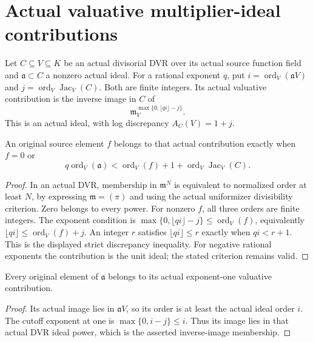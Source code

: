 \section{Actual valuative multiplier-ideal contributions}

\begin{definition}\label{def:sc0-dvr-multiplier-contribution}
\leanok
{}
Let $C\subseteq V\subseteq K$ be an actual divisorial DVR over its actual
source function field and $\mathfrak a\subset C$ a nonzero actual ideal.
For a rational exponent $q$, put $i=\operatorname{ord}_V(\mathfrak a V)$ and
$j=\operatorname{ord}_V\operatorname{Jac}_V(C)$. Both are finite integers.
Its actual valuative contribution is the inverse image in $C$ of
\[
 \mathfrak m_V^{\max\{0,\lfloor qi\rfloor-j\}}.
\]
This is an actual ideal, with log discrepancy $A_C(V)=1+j$.
\end{definition}

\begin{lemma}\label{lem:sc0-dvr-multiplier-contribution-membership}
\leanok
{}
An original source element $f$ belongs to that actual contribution exactly
when $f=0$ or
\[
 q\operatorname{ord}_V(\mathfrak a)
 <\operatorname{ord}_V(f)+1+\operatorname{ord}_V\operatorname{Jac}_V(C).
\]
\end{lemma}
\begin{proof}
In an actual DVR, membership in $\mathfrak m^N$ is equivalent to normalized
order at least $N$, by expressing $\mathfrak m=(\pi)$ and using the actual
uniformizer divisibility criterion. Zero belongs to every power. For nonzero
$f$, all three orders are finite integers. The exponent condition is
$\max\{0,\lfloor qi\rfloor-j\}\le\operatorname{ord}_V(f)$, equivalently
$\lfloor qi\rfloor\le\operatorname{ord}_V(f)+j$. An integer $r$ satisfies
$\lfloor qi\rfloor\le r$ exactly when $qi<r+1$. This is the displayed
strict discrepancy inequality. For negative rational exponents the
contribution is the unit ideal; the stated criterion remains valid.
\end{proof}

\begin{lemma}\label{lem:sc0-original-ideal-multiplier-contribution}
\leanok
{}
Every original element of $\mathfrak a$ belongs to its actual exponent-one
valuative contribution.
\end{lemma}
\begin{proof}
Its actual image lies in $\mathfrak a V$, so its order is at least the
actual ideal order $i$. The cutoff exponent at one is
$\max\{0,i-j\}\le i$. Thus its image lies in that actual DVR ideal power,
which is the asserted inverse-image membership.
\end{proof}
